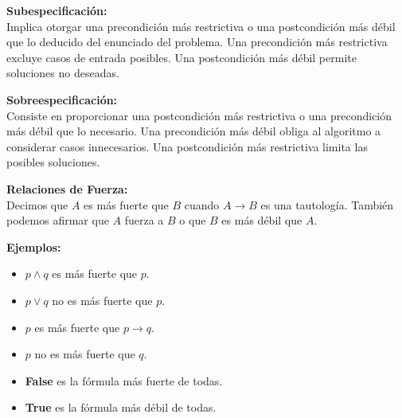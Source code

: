 \documentclass[9pt]{extarticle}  %
\begin{document}
\noindent\textbf{Subespecificación:} \\
Implica otorgar una precondición más restrictiva o una postcondición más débil que lo deducido del enunciado del problema. Una precondición más restrictiva excluye casos de entrada posibles. Una postcondición más débil permite soluciones no deseadas.

\noindent\textbf{Sobreespecificación:} \\
Consiste en proporcionar una postcondición más restrictiva o una precondición más débil que lo necesario. Una precondición más débil obliga al algoritmo a considerar casos innecesarios. Una postcondición más restrictiva limita las posibles soluciones.

\noindent\textbf{Relaciones de Fuerza:} \\
Decimos que \(A\) es más fuerte que \(B\) cuando \(A \rightarrow B\) es una tautología. También podemos afirmar que \(A\) fuerza a \(B\) o que \(B\) es más débil que \(A\).

\noindent\textbf{Ejemplos:}
\begin{itemize}
    \item \(p \land q\) es más fuerte que \(p\).
    \item \(p \lor q\) no es más fuerte que \(p\).
    \item \(p\) es más fuerte que \(p \rightarrow q\).
    \item \(p\) no es más fuerte que \(q\).
    \item \textbf{False} es la fórmula más fuerte de todas.
    \item \textbf{True} es la fórmula más débil de todas.
\end{itemize}
\end{document}
